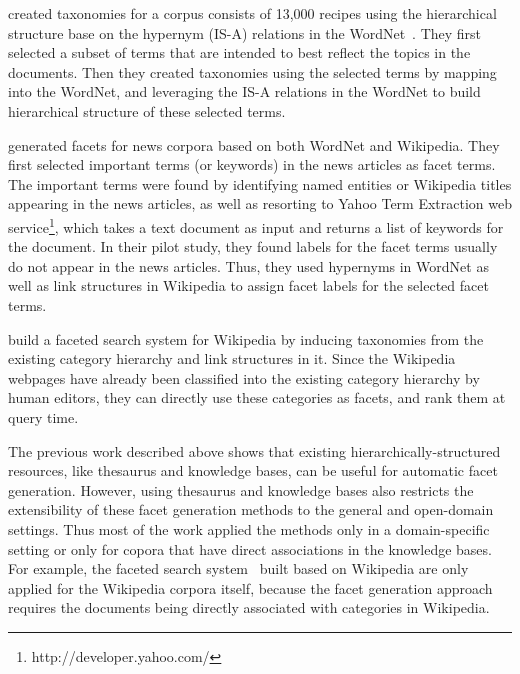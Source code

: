 \citet{stoica2007automating} created taxonomies for a corpus consists of 13,000 recipes using the hierarchical structure base on the hypernym (IS-A) relations in the WordNet~\cite{fellbaum1998wordnet}. They first selected a subset of terms that are intended to best reflect the topics in the documents. Then they created taxonomies using the selected terms by mapping into the WordNet, and leveraging the IS-A relations in the WordNet to build hierarchical structure of these selected terms.

\citet{dakka2008automatic} generated facets for news corpora based on both WordNet and Wikipedia. They first selected important terms (or keywords) in the news articles as facet terms. The important terms were found by identifying named entities or Wikipedia titles appearing in the news articles, as well as resorting to Yahoo Term Extraction web service\footnote{http://developer.yahoo.com/}, which takes a text document as input and returns a list of keywords for the document. In their pilot study, they found labels for the facet terms usually do not appear in the news articles. Thus, they used hypernyms in WordNet as well as link structures in Wikipedia to assign facet labels for the selected facet terms.

\citet{li2010facetedpedia} build a faceted search system for Wikipedia by inducing taxonomies from the existing category hierarchy and link structures in it. Since the Wikipedia webpages have already been classified into the existing category hierarchy by human editors, they can directly use these categories as facets, and rank them at query time. 

The previous work described above shows that existing hierarchically-structured resources, like thesaurus and knowledge bases, can be useful for automatic facet generation. However, using thesaurus and knowledge bases also restricts the extensibility of these facet generation methods to the general and open-domain settings. 
Thus most of the work applied the methods only in a domain-specific setting or only for copora that have direct associations in the knowledge bases.
For example, the faceted search system~\cite{li2010facetedpedia} built based on Wikipedia are only applied for the Wikipedia corpora itself, because the facet generation approach requires the documents being directly associated with categories in Wikipedia. 

